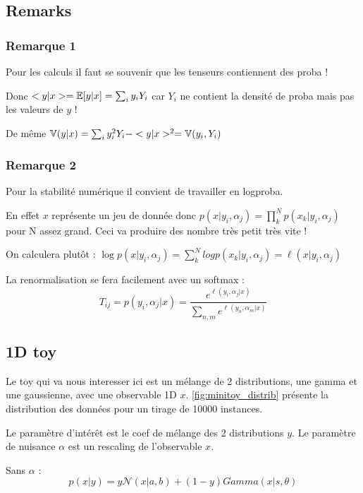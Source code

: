 \subsection{Remarks} %
\label{sub:remarks}

\subsubsection{Remarque 1}

Pour les calculs il faut se souvenir que les tenseurs contiennent des proba !

Donc $<y|x>= \mathbb{E}[y|x] = \sum_i y_i Y_i$ car $Y_i$ ne contient la densité de proba mais pas les valeurs de $y$ !

De même $\mathbb{V}(y|x) = \sum_i y_i^2 Y_i - <y|x>^2 = \mathbb{V}(y_i, Y_i)$

\subsubsection{Remarque 2}

Pour la stabilité numérique il convient de travailler en logproba.

En effet $x$ représente un jeu de donnée donc $p(x | y_i, \alpha_j) = \prod_k^N p(x_k | y_i, \alpha_j)$ pour N assez grand.
Ceci va produire des nombre très petit très vite !

On calculera plutôt : $\log p(x | y_i, \alpha_j) = \sum_k^N log p(x_k | y_i, \alpha_j) = \ell(x | y_i, \alpha_j)$

La renormalisation se fera facilement avec un softmax : 
$$ 
    T_{ij} = p(y_i, \alpha_j | x) = \frac{e^{\ell(y_i, \alpha_j| x)} }{\sum_{n,m} e^{\ell(y_n, \alpha_m| x)} }
$$


\subsection{1D toy} %
\label{sub:1d_toy}

Le toy qui va nous interesser ici est un mélange de 2 distributions, une gamma et une gaussienne, avec une observable 1D $x$.
\autoref{fig:minitoy_distrib} présente la distribution des données pour un tirage de 10000 instances.

Le paramètre d'intérêt est le coef de mélange des 2 distributions $y$.
Le paramètre de nuisance $\alpha$ est un rescaling de l'observable $x$.

Sans $\alpha$ :
$$
    p(x | y) = y \mathcal N(x|a, b) + (1-y) Gamma(x|s, \theta)
$$


